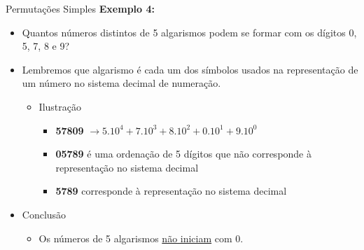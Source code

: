 \documentclass[aspectratio=169]{beamer}
\begin{document}
\begin{frame}{Permutações Simples}
    \textbf{Exemplo 4:}

    \vspace{3mm}

    \begin{itemize}
        \item[] Quantos números distintos de 5 algarismos podem se formar com os dígitos 0, 5, 7, 8 e 9?
    \end{itemize}

        \pause 
                
        \begin{itemize}
            \item Lembremos que algarismo é cada um dos símbolos usados na representação de um número no sistema decimal de numeração. \pause
            \begin{itemize}
                \item Ilustração
                \begin{itemize}
                    \item[] \textbf{57809} $\rightarrow 5.10^4 + 7.10^3 + 8.10^2 + 0.10^1 + 9.10^0$  \pause
                    \item[] \textbf{05789} é uma ordenação de 5 dígitos que não corresponde à representação no sistema decimal \pause
                    \item[] \textbf{5789} corresponde à representação no sistema decimal \pause
                \end{itemize}
            \end{itemize}
            \item Conclusão
            \begin{itemize}
                \item Os números de 5 algarismos \underline{não iniciam} com 0.
            \end{itemize}
        \end{itemize}
    
\end{frame}
\end{document}
